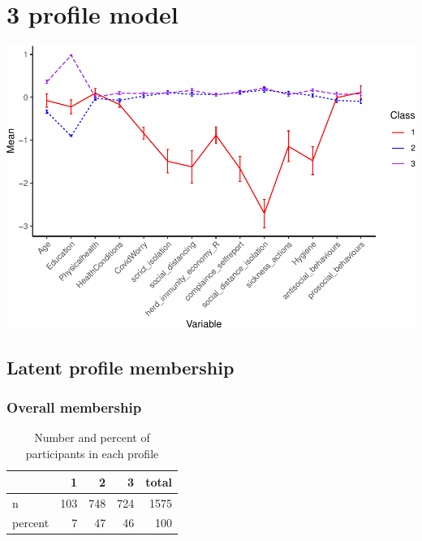 \documentclass[]{article}
\begin{document}
\newpage

\hypertarget{profile-model-1}{%
\section{3 profile model}\label{profile-model-1}}

\includegraphics{lpa_analyses_files/figure-latex/unnamed-chunk-13-1.pdf}

\hypertarget{latent-profile-membership-1}{%
\subsection{Latent profile
membership}\label{latent-profile-membership-1}}

\hypertarget{overall-membership-1}{%
\subsubsection{Overall membership}\label{overall-membership-1}}

\begin{table}[H]

\caption{\label{tab:unnamed-chunk-14}Number and percent of participants in each profile}
\centering
\fontsize{6}{8}\selectfont
\begin{tabular}[t]{lrrrr}
\toprule
  & 1 & 2 & 3 & total\\
\midrule
n & 103 & 748 & 724 & 1575\\
percent & 7 & 47 & 46 & 100\\
\bottomrule
\end{tabular}
\end{table}
\end{document}
